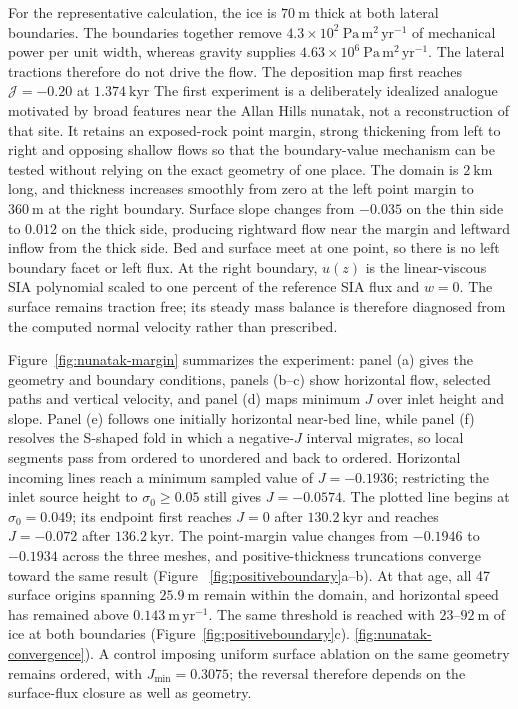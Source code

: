 \documentclass[review]{igs}
\providecommand{\DIFadd}[1]{{\protect\color{blue} \sf #1}} %
\providecommand{\DIFdel}[1]{{\protect\color{red} \scriptsize #1}} %
\providecommand{\DIFaddbegin}{} %
\providecommand{\DIFaddend}{} %
\providecommand{\DIFdelbegin}{} %
\providecommand{\DIFdelend}{} %
\newcommand{\DIFscaledelfig}{0.5}
\newlength{\DIFdelgraphicswidth} %
\newlength{\DIFdelgraphicsheight} %
\newcommand{\DIFaddincludegraphics}[2][]{{\color{blue}\fbox{\DIFOincludegraphics[#1]{#2}}}} %
\newcommand{\DIFdelincludegraphics}[2][]{%
\sbox{\DIFdelgraphicsbox}{\DIFOincludegraphics[#1]{#2}}%
\settoboxwidth{\DIFdelgraphicswidth}{\DIFdelgraphicsbox} %
\settoboxtotalheight{\DIFdelgraphicsheight}{\DIFdelgraphicsbox} %
\scalebox{\DIFscaledelfig}{%
\parbox[b]{\DIFdelgraphicswidth}{\usebox{\DIFdelgraphicsbox}\\[-\baselineskip] \rule{\DIFdelgraphicswidth}{0em}}\llap{\resizebox{\DIFdelgraphicswidth}{\DIFdelgraphicsheight}{%
\setlength{\unitlength}{\DIFdelgraphicswidth}%
\begin{picture}(1,1)%
\thicklines\linethickness{2pt} %
{\color[rgb]{1,0,0}\put(0,0){\framebox(1,1){}}}%
{\color[rgb]{1,0,0}\put(0,0){\line( 1,1){1}}}%
{\color[rgb]{1,0,0}\put(0,1){\line(1,-1){1}}}%
\end{picture}%
}\hspace*{3pt}}} %
} %
\DeclareRobustCommand{\DIFaddbegin}{\DIFOaddbegin \let\includegraphics\DIFaddincludegraphics} %
\DeclareRobustCommand{\DIFaddend}{\DIFOaddend \let\includegraphics\DIFOincludegraphics} %
\DeclareRobustCommand{\DIFdelbegin}{\DIFOdelbegin \let\includegraphics\DIFdelincludegraphics} %
\DeclareRobustCommand{\DIFdelend}{\DIFOaddend \let\includegraphics\DIFOincludegraphics} %
\begin{document}
\DIFdelbegin \DIFdel{For the representative calculation, the ice is \(70~\mathrm{m}\) thick at both lateral boundaries. The boundaries together remove \(4.3\times10^2~\mathrm{Pa\,m^2\,yr^{-1}}\) of mechanical power per unit width, whereas gravity supplies \(4.63\times10^6~\mathrm{Pa\,m^2\,yr^{-1}}\). The lateral tractions therefore do not drive the flow. The deposition map first reaches \(\mathcal{J}=-0.20\) at \(1.374~\mathrm{kyr}\) }\DIFdelend \DIFaddbegin \DIFadd{The first experiment is a deliberately idealized analogue motivated by broad features near the Allan Hills nunatak, not a reconstruction of that site. It retains an exposed-rock point margin, strong thickening from left to right and opposing shallow flows so that the boundary-value mechanism can be tested without relying on the exact geometry of one place. The domain is \(2~\mathrm{km}\) long, and thickness increases smoothly from zero at the left point margin to \(360~\mathrm{m}\) at the right boundary. Surface slope changes from \(-0.035\) on the thin side to \(0.012\) on the thick side, producing rightward flow near the margin and leftward inflow from the thick side. Bed and surface meet at one point, so there is no left boundary facet or left flux. At the right boundary, \(u(z)\) is the linear-viscous SIA polynomial scaled to one percent of the reference SIA flux and \(w=0\). The surface remains traction free; its steady mass balance is therefore diagnosed from the computed normal velocity rather than prescribed.
}

\DIFadd{Figure~\ref{fig:nunatak-margin} summarizes the experiment: panel (a) gives the geometry and boundary conditions, panels (b--c) show horizontal flow, selected paths and vertical velocity, and panel (d) maps minimum \(J\) over inlet height and slope. Panel (e) follows one initially horizontal near-bed line, while panel (f) resolves the S-shaped fold in which a negative-\(J\) interval migrates, so local segments pass from ordered to unordered and back to ordered. Horizontal incoming lines reach a minimum sampled value of \(J=-0.1936\); restricting the inlet source height to \(\sigma_0\geq0.05\) still gives \(J=-0.0574\). The plotted line begins at \(\sigma_0=0.049\); its endpoint first reaches \(J=0\) after \(130.2~\mathrm{kyr}\) and reaches \(J=-0.072\) after \(136.2~\mathrm{kyr}\). The point-margin value changes from \(-0.1946\) to \(-0.1934\) across the three meshes, and positive-thickness truncations converge toward the same result }\DIFaddend (Figure~\DIFdelbegin \DIFdel{\ref{fig:positiveboundary}a--b). At that age, all 47 surface origins spanning \(25.9~\mathrm{m}\) remain within the domain, and horizontal speed has remained above \(0.143~\mathrm{m\,yr^{-1}}\).
The same threshold is reached with \(23\)--\(92~\mathrm{m}\) of ice at both boundaries (Figure~\ref{fig:positiveboundary}c). }\DIFdelend \DIFaddbegin \DIFadd{\ref{fig:nunatak-convergence}). A control imposing uniform surface ablation on the same geometry remains ordered, with \(J_{\min}=0.3075\); the reversal therefore depends on the surface-flux closure as well as geometry.
}\DIFaddend 
\end{document}
